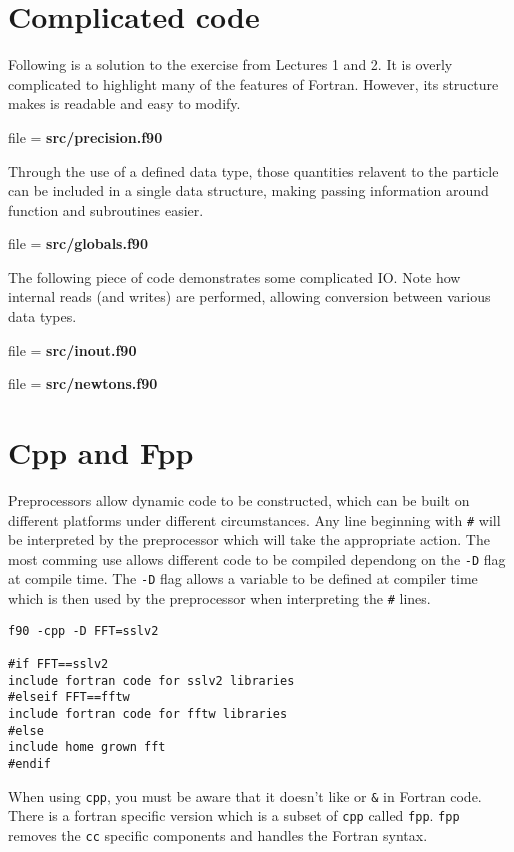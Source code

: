 \documentclass[12pt,a4paper,oneside,openany]{report}
\newcommand{\fcode}[1]{\par \small file = \textbf{#1}  \normalsize}
\newcommand{\code}[1]{\texttt{#1}}
\begin{document}
\section*{Complicated code}

Following is a solution to the exercise from Lectures 1 and 2.  It is overly complicated to highlight many of the features of Fortran.  However, its structure makes is readable and easy to modify.

\fcode{src/precision.f90}

Through the use of a defined data type, those quantities relavent to the particle can be included in a single data structure, making passing information around function and subroutines easier.

\fcode{src/globals.f90}

\newpage

The following piece of code demonstrates some complicated IO.  Note how internal reads (and writes) are performed, allowing conversion between various data types.

\fcode{src/inout.f90}

\newpage

\fcode{src/newtons.f90}

\newpage

\section*{Cpp and Fpp}

Preprocessors allow dynamic code to be constructed, which can be built on different platforms under different circumstances.  Any line beginning with \code{\#} will be interpreted by the preprocessor which will take the appropriate action.  The most comming use allows different code to be compiled dependong on the \code{-D} flag at compile time.  The \code{-D} flag allows a variable to be defined at compiler time which is then used by the preprocessor when interpreting the \code{\#} lines.

\begin{verbatim}
f90 -cpp -D FFT=sslv2

#if FFT==sslv2
include fortran code for sslv2 libraries
#elseif FFT==fftw
include fortran code for fftw libraries
#else
include home grown fft
#endif
\end{verbatim}

When using \code{cpp}, you must be aware that it doesn't like \code{\/\/} or \code{\&} in Fortran code.  There is a fortran specific version which is a subset of \code{cpp} called \code{fpp}.  \code{fpp} removes the \code{cc} specific components and handles the Fortran syntax.
\end{document}
